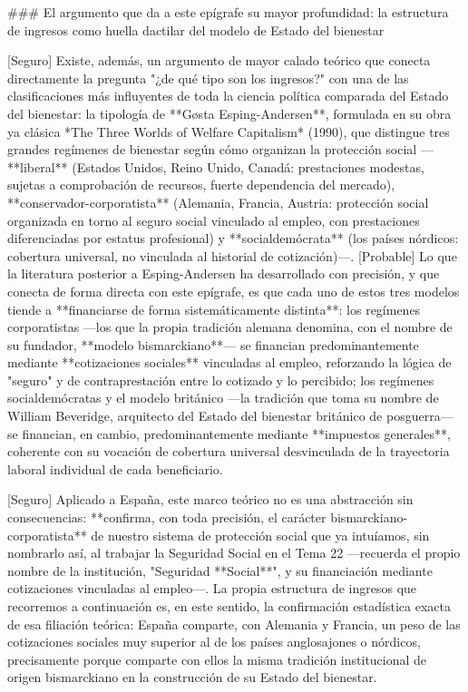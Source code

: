 \documentclass[10pt,a4paper]{article}
\begin{document}
### El argumento que da a este epígrafe su mayor profundidad: la estructura de ingresos como huella dactilar del modelo de Estado del bienestar

[Seguro] Existe, además, un argumento de mayor calado teórico que conecta directamente la pregunta "¿de qué tipo son los ingresos?" con una de las clasificaciones más influyentes de toda la ciencia política comparada del Estado del bienestar: la tipología de **Gøsta Esping-Andersen**, formulada en su obra ya clásica *The Three Worlds of Welfare Capitalism* (1990), que distingue tres grandes regímenes de bienestar según cómo organizan la protección social —**liberal** (Estados Unidos, Reino Unido, Canadá: prestaciones modestas, sujetas a comprobación de recursos, fuerte dependencia del mercado), **conservador-corporatista** (Alemania, Francia, Austria: protección social organizada en torno al seguro social vinculado al empleo, con prestaciones diferenciadas por estatus profesional) y **socialdemócrata** (los países nórdicos: cobertura universal, no vinculada al historial de cotización)—. [Probable] Lo que la literatura posterior a Esping-Andersen ha desarrollado con precisión, y que conecta de forma directa con este epígrafe, es que cada uno de estos tres modelos tiende a **financiarse de forma sistemáticamente distinta**: los regímenes corporatistas —los que la propia tradición alemana denomina, con el nombre de su fundador, **modelo bismarckiano**— se financian predominantemente mediante **cotizaciones sociales** vinculadas al empleo, reforzando la lógica de "seguro" y de contraprestación entre lo cotizado y lo percibido; los regímenes socialdemócratas y el modelo británico —la tradición que toma su nombre de William Beveridge, arquitecto del Estado del bienestar británico de posguerra— se financian, en cambio, predominantemente mediante **impuestos generales**, coherente con su vocación de cobertura universal desvinculada de la trayectoria laboral individual de cada beneficiario.

[Seguro] Aplicado a España, este marco teórico no es una abstracción sin consecuencias: **confirma, con toda precisión, el carácter bismarckiano-corporatista** de nuestro sistema de protección social que ya intuíamos, sin nombrarlo así, al trabajar la Seguridad Social en el Tema 22 —recuerda el propio nombre de la institución, "Seguridad **Social**", y su financiación mediante cotizaciones vinculadas al empleo—. La propia estructura de ingresos que recorremos a continuación es, en este sentido, la confirmación estadística exacta de esa filiación teórica: España comparte, con Alemania y Francia, un peso de las cotizaciones sociales muy superior al de los países anglosajones o nórdicos, precisamente porque comparte con ellos la misma tradición institucional de origen bismarckiano en la construcción de su Estado del bienestar.
\end{document}
